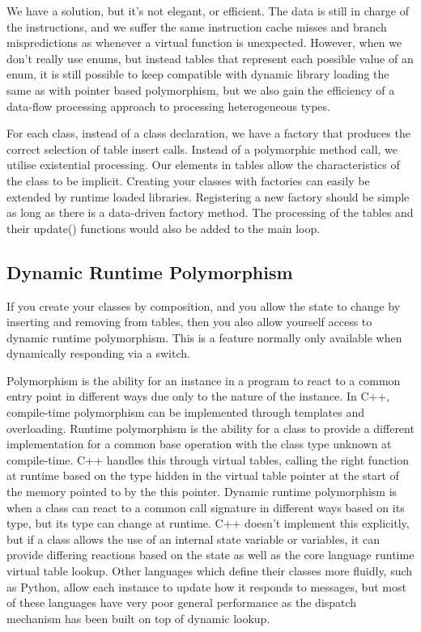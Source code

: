 \documentclass[a4paper,12pt]{article}
\begin{document}
We have a solution, but it's not elegant, or efficient.
The data is still in charge of the instructions, and we suffer the same instruction cache misses and branch mispredictions as whenever a virtual function is unexpected.
However, when we don't really use enums, but instead tables that represent each possible value of an enum, it is still possible to keep compatible with dynamic library loading the same as with pointer based polymorphism, but we also gain the efficiency of a data-flow processing approach to processing heterogeneous types.

For each class, instead of a class declaration, we have a factory that produces the correct selection of table insert calls.
Instead of a polymorphic method call, we utilise existential processing.
Our elements in tables allow the characteristics of the class to be implicit.
Creating your classes with factories can easily be extended by runtime loaded libraries.
Registering a new factory should be simple as long as there is a data-driven factory method.
The processing of the tables and their update() functions would also be added to the main loop.

\subsection{Dynamic Runtime Polymorphism}

If you create your classes by composition, and you allow the state to change by inserting and removing from tables, then you also allow yourself access to dynamic runtime polymorphism.
This is a feature normally only available when dynamically responding via a switch.

Polymorphism is the ability for an instance in a program to react to a common entry point in different ways due only to the nature of the instance.
In C++, compile-time polymorphism can be implemented through templates and overloading.
Runtime polymorphism is the ability for a class to provide a different implementation for a common base operation with the class type unknown at compile-time.
C++ handles this through virtual tables, calling the right function at runtime based on the type hidden in the virtual table pointer at the start of the memory pointed to by the this pointer.
Dynamic runtime polymorphism is when a class can react to a common call signature in different ways based on its type, but its type can change at runtime.
C++ doesn't implement this explicitly, but if a class allows the use of an internal state variable or variables, it can provide differing reactions based on the state as well as the core language runtime virtual table lookup.
Other languages which define their classes more fluidly, such as Python, allow each instance to update how it responds to messages, but most of these languages have very poor general performance as the dispatch mechanism has been built on top of dynamic lookup.
\end{document}
